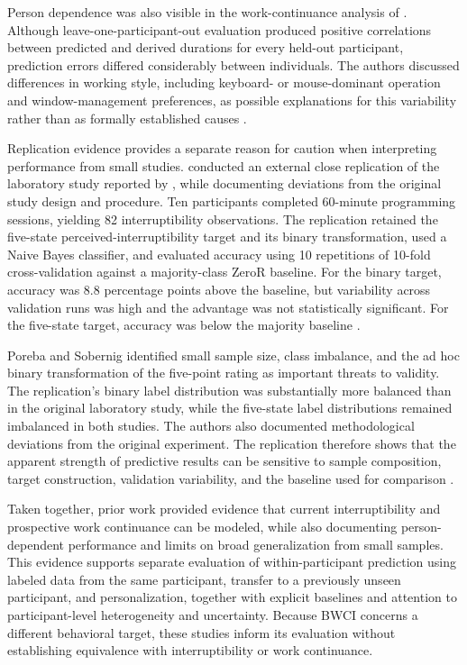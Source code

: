 Person dependence was also visible in the work-continuance analysis of \textcite{shiratori2020workContinuance}. Although leave-one-participant-out evaluation produced positive correlations between predicted and derived durations for every held-out participant, prediction errors differed considerably between individuals. The authors discussed differences in working style, including keyboard- or mouse-dominant operation and window-management preferences, as possible explanations for this variability rather than as formally established causes \parencite{shiratori2020workContinuance}.

Replication evidence provides a separate reason for caution when interpreting performance from small studies. \textcite{poreba2026replication} conducted an external close replication of the laboratory study reported by \textcite{zueger2015interruptibility}, while documenting deviations from the original study design and procedure. Ten participants completed 60-minute programming sessions, yielding 82 interruptibility observations. The replication retained the five-state perceived-interruptibility target and its binary transformation, used a Naive Bayes classifier, and evaluated accuracy using 10 repetitions of 10-fold cross-validation against a majority-class ZeroR baseline. For the binary target, accuracy was 8.8 percentage points above the baseline, but variability across validation runs was high and the advantage was not statistically significant. For the five-state target, accuracy was below the majority baseline \parencite{poreba2026replication}.

Poreba and Sobernig identified small sample size, class imbalance, and the ad hoc binary transformation of the five-point rating as important threats to validity. The replication's binary label distribution was substantially more balanced than in the original laboratory study, while the five-state label distributions remained imbalanced in both studies. The authors also documented methodological deviations from the original experiment. The replication therefore shows that the apparent strength of predictive results can be sensitive to sample composition, target construction, validation variability, and the baseline used for comparison \parencite{poreba2026replication}.

Taken together, prior work provided evidence that current interruptibility and prospective work continuance can be modeled, while also documenting person-dependent performance and limits on broad generalization from small samples. This evidence supports separate evaluation of within-participant prediction using labeled data from the same participant, transfer to a previously unseen participant, and personalization, together with explicit baselines and attention to participant-level heterogeneity and uncertainty. Because BWCI concerns a different behavioral target, these studies inform its evaluation without establishing equivalence with interruptibility or work continuance.

